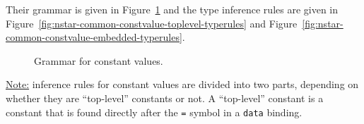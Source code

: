 Their grammar is given in Figure~\ref{fig:nstar-common-constvalue-grammar} and the type inference rules are given in Figure~\ref{fig:nstar-common-constvalue-toplevel-typerules} and Figure~\ref{fig:nstar-common-constvalue-embedded-typerules}.

\begin{figure}[H]
	\centering


	\caption{Grammar for constant values.}
	\label{fig:nstar-common-constvalue-grammar}
\end{figure}

\underline{Note:} inference rules for constant values are divided into two parts, depending on whether they are ``top-level'' constants or not.
A ``top-level'' constant is a constant that is found directly after the \texttt{=} symbol in a \texttt{data} binding.

